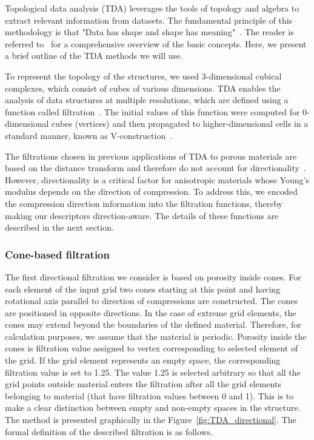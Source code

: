 \documentclass[sn-mathphys,Numbered]{sn-jnl}
\theoremstyle{definition}
\begin{document}
Topological data analysis (TDA) leverages the tools of topology and algebra to extract relevant information from datasets. The fundamental principle of this methodology is that "Data has shape and shape has meaning"~\cite{Dlotko2024}. The reader is referred to~\cite{Dlotko2024, Gurnari2025} for a comprehensive overview of the basic concepts. Here, we present a brief outline of the TDA methods we will use. 



To represent the topology of the structures, we used 3-dimensional cubical complexes, which consist of cubes of various dimensions. TDA enables the analysis of data structures at multiple resolutions, which are defined using a function called filtration~\cite{Dlotko2024, Gurnari2025}. The initial values of this function were computed for 0-dimensional cubes (vertices) and then propagated to higher-dimensional cells in a standard manner, known as V-construction~\cite{Robins2011}.

The filtrations chosen in previous applications of TDA to porous materials are based on the distance transform and therefore do not account for directionality~\cite{Robins2016, Herring2019, Moon2019, Thompson2023, Lisitsa2020, Lee2017, Krishnapriyan2021, Chen2025, Wang2025, Jiang2018, Ishihara2023}. However, directionality is a critical factor for anisotropic materials whose Young's modulus depends on the direction of compression. To address this, we encoded the compression direction information into the filtration functions, thereby making our descriptors direction-aware. The details of these functions are described in the next section.

\subsubsection{Cone-based filtration}

The first directional filtration we consider is based on porosity inside cones. For each element of the input grid two cones starting at this point and having rotational axis parallel to direction of compressions are constructed. The cones are positioned in opposite directions. In the case of extreme grid elements, the cones may extend beyond the boundaries of the defined material. Therefore, for calculation purposes, we assume that the material is periodic. Porosity inside the cones is filtration value assigned to vertex corresponding to selected element of the grid. If the grid element represents an empty space, the corresponding filtration value is set to 1.25. The value 1.25 is selected arbitrary so that all the grid points outside material enters the filtration after all the grid elements belonging to material (that have filtration values between 0 and 1). This is to make a clear distinction between empty and non-empty spaces in the structure. The method is presented graphically in the Figure~\ref{fig:TDA_directional}. The formal definition of the described filtration is as follows.
\end{document}
